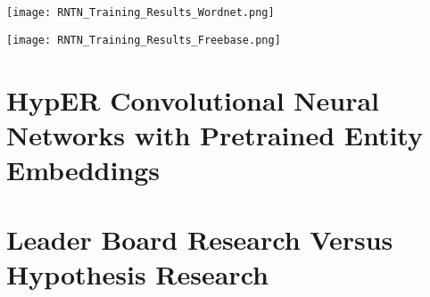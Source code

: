 \begin{center}
    \texttt{[image: RNTN\_Training\_Results\_Wordnet.png]}
\end{center}

\begin{center}
    \texttt{[image: RNTN\_Training\_Results\_Freebase.png]}
\end{center}



\section{HypER Convolutional Neural Networks with Pretrained Entity Embeddings}

\section{Leader Board Research Versus Hypothesis Research}


